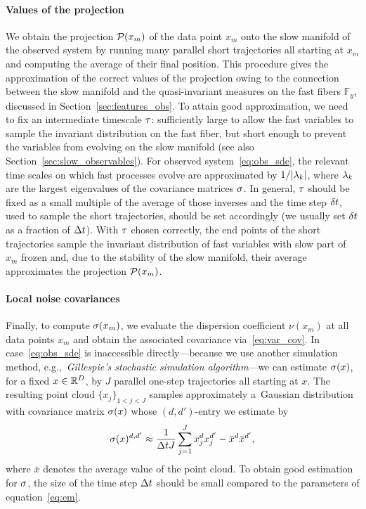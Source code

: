 \documentclass{article}
\newcommand{\ffib}{\mathbb{F}} %
\begin{document}
\paragraph{Values of the projection}
We obtain the projection $\mathcal{P}(x_m)$ of the data point $x_m$ onto the slow manifold of the observed system by running many parallel short trajectories all starting at $x_m$ and computing the average of their final position. This procedure gives the approximation of the correct values of the projection owing to the connection between the slow manifold and the quasi-invariant measures on the fast fibers $\ffib_y$, discussed in Section~\ref{sec:features_obs}. To attain good approximation, we need to fix an intermediate timescale $\tau$: sufficiently large to allow the fast variables to sample the invariant distribution on the fast fiber, but short enough to prevent the variables from evolving on the slow manifold (see also Section~\ref{sec:slow_observables}). For observed system~\eqref{eq:obs_sde}, the relevant time scales on which fast processes evolve are approximated by $1/|\lambda_k|$, where $\lambda_k$ are the largest eigenvalues of the covariance matrices $\sigma$. In general, $\tau$ should be fixed as a small multiple of the average of those inverses and the time step $\delta t$, used to sample the short trajectories, should be set accordingly (we usually set $\delta t$ as a fraction of $\Delta t$). With $\tau$ chosen correctly, the end points of the short trajectories sample the invariant distribution of fast variables with slow part of $x_m$ frozen and, due to the stability of the slow manifold, their average approximates the projection $\mathcal{P}(x_m)$.

\paragraph{Local noise covariances}
Finally, to compute $\sigma(x_m)$, we evaluate the dispersion coefficient $\nu(x_m)$ at all data points $x_m$ and obtain the associated covariance via~\eqref{eq:var_cov}. In case~\eqref{eq:obs_sde} is inaccessible directly---because we use another simulation method, e.g.,~\emph{Gillespie's stochastic simulation algorithm}---we can estimate $\sigma(x)$, for a fixed $x\in\mathbb{R}^D$, by $J$ parallel one-step trajectories all starting at $x$. The resulting point cloud $\{x_j\}_{1<j<J}$ samples approximately a~Gaussian distribution with covariance matrix $\sigma(x)$ whose $(d,d')$-entry we estimate by
\begin{equation}
    \sigma(x)^{d,d'}\approx\frac{1}{\Delta tJ}\sum_{j=1}^J x_j^dx_j^{d'} - \bar{x}^d\bar{x}^{d'},
\end{equation}
where $\bar{x}$ denotes the average value of the point cloud. To obtain good estimation for $\sigma$, the size of the time step $\Delta t$ should be small compared to the parameters of equation~\eqref{eq:em}.
\end{document}
